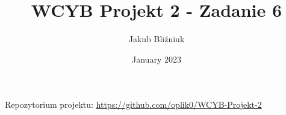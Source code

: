 \documentclass{report}
\title{WCYB Projekt 2 - Zadanie 6}
\author{Jakub Bliźniuk}
\date{January 2023}
\numberwithin{equation}{section}
\begin{document}
\pagestyle{fancy}
\fancyfoot{}
\fancyfoot[C]{\thepage}

\begin{titlepage}
    \vfill
    \maketitle
    \thispagestyle{fancy}
\end{titlepage}
\tableofcontents
\thispagestyle{fancy}
\setcounter{chapter}{5}
\begin{center}
    Repozytorium projektu: \url{https://github.com/oplik0/WCYB-Projekt-2}
\end{center}

\end{document}
